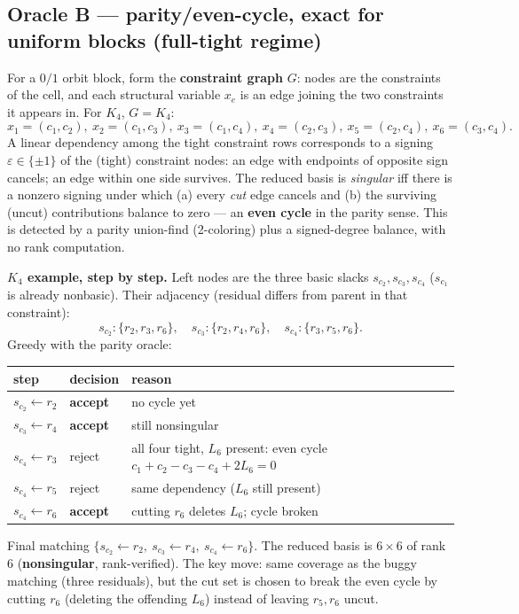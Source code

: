 \documentclass[11pt]{article}
\newcommand{\slack}[1]{s_{#1}}
\begin{document}
\subsection{Oracle B --- parity/even-cycle, exact for uniform blocks (full-tight
regime)}

For a $0/1$ orbit block, form the \textbf{constraint graph} $G$: nodes are the
constraints of the cell, and each structural variable $x_e$ is an edge joining the
two constraints it appears in. For $K_4$, $G=K_4$:
\[
x_1{=}(c_1,c_2),\ x_2{=}(c_1,c_3),\ x_3{=}(c_1,c_4),\
x_4{=}(c_2,c_3),\ x_5{=}(c_2,c_4),\ x_6{=}(c_3,c_4).
\]
A linear dependency among the tight constraint rows corresponds to a signing
$\varepsilon\in\{\pm1\}$ of the (tight) constraint nodes: an edge with endpoints
of opposite sign cancels; an edge within one side survives. The reduced basis is
\emph{singular} iff there is a nonzero signing under which (a) every \emph{cut}
edge cancels and (b) the surviving (uncut) contributions balance to zero --- an
\textbf{even cycle} in the parity sense. This is detected by a parity union-find
(2-coloring) plus a signed-degree balance, with no rank computation.

\textbf{$K_4$ example, step by step.} Left nodes are the three basic slacks
$\slack{c_2},\slack{c_3},\slack{c_4}$ ($\slack{c_1}$ is already nonbasic). Their
adjacency (residual differs from parent in that constraint):
\[
\slack{c_2}:\{r_2,r_3,r_6\},\quad \slack{c_3}:\{r_2,r_4,r_6\},\quad
\slack{c_4}:\{r_3,r_5,r_6\}.
\]
Greedy with the parity oracle:
\begin{center}
\begin{tabular}{lll}
\toprule
step & decision & reason\\
\midrule
$\slack{c_2}\leftarrow r_2$ & \textbf{accept} & no cycle yet\\
$\slack{c_3}\leftarrow r_4$ & \textbf{accept} & still nonsingular\\
$\slack{c_4}\leftarrow r_3$ & reject & all four tight, $L_6$ present: even cycle $c_1{+}c_2{-}c_3{-}c_4{+}2L_6{=}0$\\
$\slack{c_4}\leftarrow r_5$ & reject & same dependency ($L_6$ still present)\\
$\slack{c_4}\leftarrow r_6$ & \textbf{accept} & cutting $r_6$ deletes $L_6$; cycle broken\\
\bottomrule
\end{tabular}
\end{center}
Final matching $\{\slack{c_2}{\leftarrow}r_2,\ \slack{c_3}{\leftarrow}r_4,\
\slack{c_4}{\leftarrow}r_6\}$. The reduced basis is $6\times6$ of rank $6$
(\textbf{nonsingular}, rank-verified). The key move: same coverage as the buggy
matching (three residuals), but the cut set is chosen to break the even cycle by
cutting $r_6$ (deleting the offending $L_6$) instead of leaving $r_5,r_6$ uncut.
\end{document}
